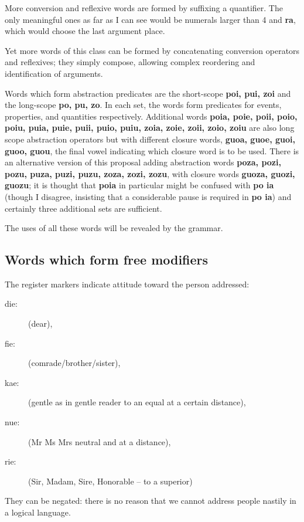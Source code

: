 \documentclass[12pt]{book}
\begin{document}
{More conversion and reflexive words are formed by suffixing a quantifier.   The only meaningful ones as far as I can see would be numerals larger than 4 and {\bf ra}, which would choose the last argument place.

Yet more words of this class can be formed by concatenating conversion operators and reflexives; they simply compose, allowing complex reordering and identification of arguments.

Words which form abstraction predicates are the short-scope {\bf poi, pui, zoi} and the long-scope {\bf po, pu, zo}.  In each set, the words form predicates for events, properties, and quantities respectively.  Additional words {\bf poia, poie, poii, poio, poiu, puia, puie, puii, puio, puiu, zoia, zoie, zoii, zoio, zoiu} are also long scope abstraction operators but with different closure words, {\bf guoa, guoe, guoi, guoo, guou}, the final vowel indicating which closure word is to be used.  There is an alternative version of this proposal adding abstraction words {\bf poza, pozi, pozu, puza, puzi, puzu, zoza, zozi, zozu}, with closure words {\bf guoza, guozi, guozu}; it is thought that {\bf poia} in particular might be confused with {\bf po ia} (though I disagree, insisting that a considerable pause is required in {\bf po ia}) and certainly three additional sets are sufficient.


The uses of all these words will be revealed by the grammar.

\subsection{Words which form free modifiers}

The register markers indicate attitude toward the person addressed:  

\begin{description}

\item[die:] (dear), \item[fie:] (comrade/brother/sister), \item[kae:] (gentle as in gentle reader to an equal at a certain distance), \item[nue:] (Mr Ms Mrs neutral and at a distance),\item[rie:] (Sir, Madam, Sire, Honorable -- to a superior)

\end{description}   They can be negated:  there is no reason that we cannot address people nastily in a logical language.

}
\end{document}
